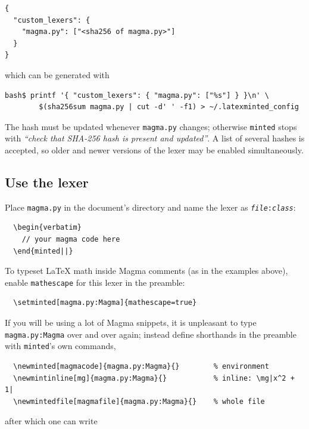 \documentclass{article}
\begin{document}
\begin{verbatim}
{
  "custom_lexers": {
    "magma.py": ["<sha256 of magma.py>"]
  }
}
\end{verbatim}

which can be generated with

\begin{verbatim}
bash$ printf '{ "custom_lexers": { "magma.py": ["%s"] } }\n' \
        $(sha256sum magma.py | cut -d' ' -f1) > ~/.latexminted_config
\end{verbatim}

The hash must be updated whenever \texttt{magma.py} changes; otherwise
\texttt{minted} stops with \textit{``check that SHA-256 hash is present
and updated''}. A list of several hashes is accepted, so older and
newer versions of the lexer may be enabled simultaneously.


\subsection{Use the lexer}

Place \texttt{magma.py} in the document's directory and name the lexer
as \texttt{\textit{file}:\textit{class}}:

\begin{verbatim}
  \begin{verbatim}
    // your magma code here
  \end{minted||}
\end{verbatim}

To typeset {\LaTeX} math inside Magma comments (as in the examples
above), enable \texttt{mathescape} for this lexer in the preamble:

\begin{verbatim}
  \setminted[magma.py:Magma]{mathescape=true}
\end{verbatim}

If you will be using a lot of Magma snippets, it is unpleasant to
type \texttt{magma.py:Magma} over and over again; instead define
shorthands in the preamble with \texttt{minted}'s own commands,

\begin{verbatim}
  \newminted[magmacode]{magma.py:Magma}{}        % environment
  \newmintinline[mg]{magma.py:Magma}{}           % inline: \mg|x^2 + 1|
  \newmintedfile[magmafile]{magma.py:Magma}{}    % whole file
\end{verbatim}

after which one can write
\end{document}
